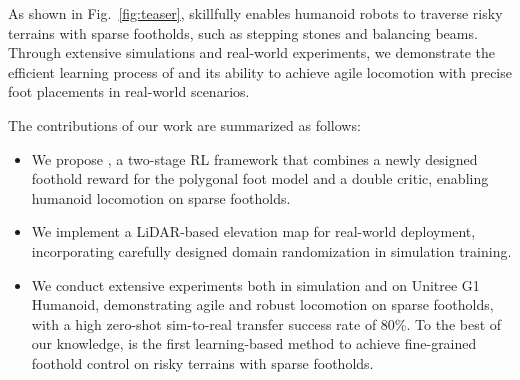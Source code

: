 As shown in Fig.~\ref{fig:teaser}, \beamdojo skillfully enables humanoid robots to traverse risky terrains with sparse footholds, such as stepping stones and balancing beams. Through extensive simulations and real-world experiments, we demonstrate the efficient learning process of \beamdojo and its ability to achieve agile locomotion with precise foot placements in real-world scenarios.

The contributions of our work are summarized as follows: 
\begin{itemize}
    \item We propose \beamdojo, a two-stage RL framework that combines a newly designed foothold reward for the polygonal foot model and a double critic, enabling humanoid locomotion on sparse footholds. 
    \item We implement a LiDAR-based elevation map for real-world deployment, incorporating carefully designed domain randomization in simulation training.
    \item We conduct extensive experiments both in simulation and on Unitree G1 Humanoid, demonstrating agile and robust locomotion on sparse footholds, with a high zero-shot sim-to-real transfer success rate of 80\%.  To the best of our knowledge, \beamdojo is the first learning-based method to achieve fine-grained foothold control on risky terrains with sparse footholds.
\end{itemize}
